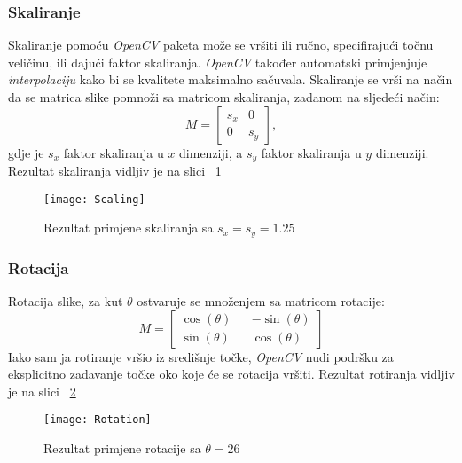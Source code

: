 \subsubsection{Skaliranje}
Skaliranje pomoću \emph{OpenCV} paketa može se vršiti ili ručno, specifirajući točnu veličinu, ili dajući faktor skaliranja.
\emph{OpenCV} također automatski primjenjuje \emph{interpolaciju} kako bi se kvalitete maksimalno sačuvala.
Skaliranje se vrši na način da se matrica slike pomnoži sa matricom skaliranja, zadanom na sljedeći način:
$$
M
=
\begin{bmatrix}
	s_{x} & 0 \\
	0 & s_{y}
\end{bmatrix},
$$
gdje je $s_{x}$ faktor skaliranja u $x$ dimenziji, a $s_{y}$ faktor skaliranja u $y$ dimenziji.
Rezultat skaliranja vidljiv je na slici ~\ref{fig:scaling}
\lstset{numbers=left}

\begin{figure}[h!]
	\centering
	\texttt{[image: Scaling]}
	 \caption{Rezultat primjene skaliranja sa $s_{x} = s_{y} = 1.25$}
 	 \label{fig:scaling}
\end{figure}
\subsubsection{Rotacija}
Rotacija slike, za kut $\theta$ ostvaruje se množenjem sa matricom rotacije:
$$
M
=
\begin{bmatrix}
	\cos(\theta) && -\sin(\theta) \\
	\sin(\theta) && \cos(\theta)
\end{bmatrix}
$$
Iako sam ja rotiranje vršio iz središnje točke, \emph{OpenCV} nudi podršku za eksplicitno zadavanje točke oko koje će se rotacija vršiti.
Rezultat rotiranja vidljiv je na slici ~\ref{fig:Rotating}
\lstset{numbers=left}

\begin{figure}[h!]
	\centering
	\texttt{[image: Rotation]}
	 \caption{Rezultat primjene rotacije sa $\theta = 26$}
 	 \label{fig:Rotating}
\end{figure}
